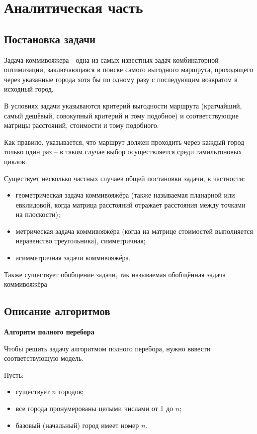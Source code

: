 \chapter{Аналитическая часть}

\section{Постановка задачи}

Задача коммивояжера - одна из самых известных задач комбинаторной оптимизации, заключающаяся в поиске самого выгодного маршрута, проходящего через указанные города хотя бы по одному разу с последующим возвратом в исходный город. 

В условиях задачи указываются критерий выгодности маршрута (кратчайший, самый дешёвый, совокупный критерий и тому подобное) и соответствующие матрицы расстояний, стоимости и тому подобного. 

Как правило, указывается, что маршрут должен проходить через каждый город только один раз -- в таком случае выбор осуществляется среди гамильтоновых циклов.

Существует несколько частных случаев общей постановки задачи, в частности:

\begin{itemize}
\item геометрическая задача коммивояжёра (также называемая планарной или евклидовой, когда матрица расстояний отражает расстояния между точками на плоскости);
\item метрическая задача коммивояжёра (когда на матрице стоимостей выполняется неравенство треугольника), симметричная;
\item асимметричная задачи коммивояжёра.
\end{itemize} 

Также существует обобщение задачи, так называемая обобщённая задача коммивояжёра

\section{Описание алгоритмов}

\textbf{Алгоритм полного перебора}

Чтобы решить задачу алгоритмом полного перебора, нужно вввести соответствующую модель. 

Пусть:
\begin{itemize}
\item существует $n$ городов;
\item все города пронумерованы целыми числами от 1 до $n$;
\item базовый (начальный) город имеет номер $n$.
\end{itemize}

